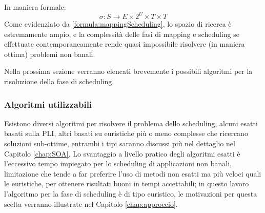 In maniera formale:
\begin{equation}
\label{formula:mappingScheduling}
 \sigma : S \rightarrow E \times 2^{U} \times T \times T
\end{equation}
Come evidenziato da \eqref{formula:mappingScheduling}, lo spazio di ricerca è 
estremamente ampio, e la complessità delle fasi di mapping e scheduling se effettuate 
contemporaneamente rende quasi impossibile risolvere (in maniera ottima) problemi non 
banali.

Nella prossima sezione verranno elencati brevemente i possibili algoritmi per la 
risoluzione della fase di scheduling.

\subsubsection{Algoritmi utilizzabili}
Esistono diversi algoritmi per risolvere il problema dello scheduling, alcuni esatti 
basati sulla \ac{PLI}, altri basati su euristiche più o meno complesse che ricercano 
soluzioni sub-ottime, entrambi i tipi saranno discussi più nel dettaglio nel Capitolo 
\ref{chap:SOA}. Lo svantaggio a livello pratico degli algoritmi esatti è l'eccessivo tempo 
impiegato per lo scheduling di applicazioni non banali, limitazione che tende a far 
preferire l'uso di metodi non esatti ma più veloci quali le euristiche, per ottenere 
risultati buoni in tempi accettabili; in questo lavoro l'algoritmo per la fase di 
scheduling è di tipo euristico, le motivazioni per questa scelta verranno illustrate nel 
Capitolo \ref{chap:approccio}.
